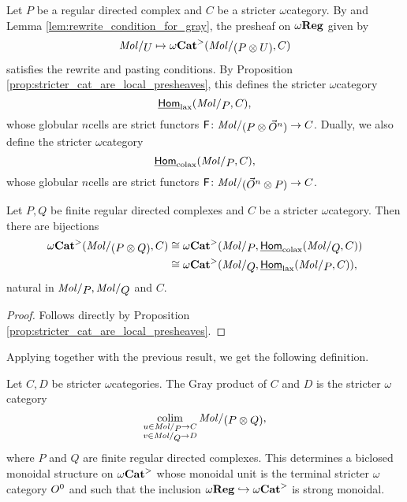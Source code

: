 \begin{dfn} 
    Let \( P \) be a regular directed complex and \( C \) be a stricter \( \omega \)\nbd category.
    By \cite[Lemma 7.2.8]{hadzihasanovic2024combinatorics} and Lemma \ref{lem:rewrite_condition_for_gray}, the presheaf on \( \omega\mathbf{Reg} \) given by
    \begin{equation*}
        \molecin{U} \mapsto \somegaCat(\molecin{(P \gray U)}, C) 
    \end{equation*}
    satisfies the rewrite and pasting conditions.
    By Proposition \ref{prop:stricter_cat_are_local_presheaves}, this defines the stricter \( \omega \)\nbd category 
    \begin{equation*}
        \homlax(\molecin{P}, C),
    \end{equation*}
    whose globular \( n \)\nbd cells are strict functors \( \F \colon \molecin{(P \gray \dglobe{n})} \to C \).
    Dually, we also define the stricter \( \omega \)\nbd category
    \begin{equation*}
        \homcolax(\molecin{P}, C),
    \end{equation*}
    whose globular \( n \)\nbd cells are strict functors \( \F \colon \molecin{(\dglobe{n} \gray P)} \to C \).
\end{dfn}

\begin{lem}
    Let \( P, Q \) be finite regular directed complexes and \( C \) be a stricter \( \omega \)\nbd category.
    Then there are bijections
    \begin{align*}
        \somegaCat(\molecin{(P \gray Q)}, C) &\cong \somegaCat(\molecin{P}, \homcolax(\molecin{Q}, C)) \\
                                             &\cong \somegaCat(\molecin{Q}, \homlax(\molecin{P}, C)),
    \end{align*}
    natural in \( \molecin{P}, \molecin{Q} \) and \( C \).
\end{lem}
\begin{proof}
    Follows directly by Proposition \ref{prop:stricter_cat_are_local_presheaves}.
\end{proof}

\noindent Applying \cite[Th\'eor\`eme 5.3]{ara2020joint} together with the previous result, we get the following definition.
\begin{dfn}  \label{dfn:gray_product_stricter_categories} 
    Let \( C, D \) be stricter \( \omega \)\nbd categories.
    The Gray product of \( C \) and \( D \) is the stricter \( \omega \)\nbd category
    \begin{equation*}
        \colim_{\substack{u \in \molecin{P} \to C \\ v \in\molecin{Q} \to D}} \molecin{(P \gray Q)},
    \end{equation*}
    where \( P \) and \( Q \) are finite regular directed complexes.
    This determines a biclosed monoidal structure on \( {\omega\mathbf{Cat}}^> \) whose monoidal unit is the terminal stricter \( \omega \)\nbd category \( O^{0} \) and such that the inclusion \( \omega\mathbf{Reg} \hookrightarrow {\omega\mathbf{Cat}}^> \) is strong monoidal.
\end{dfn}

